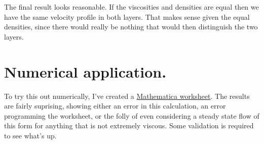 The final result looks reasonable.  If the viscosities and densities are equal then we have the same velocity profile in both layers.  That makes sense given the equal densities, since there would really be nothing that would then distinguish the two layers.

\section{Numerical application.}

To try this out numerically, I've created a \href{https://raw.github.com/peeterjoot/physicsplay/master/notes/phy454/twoLayerInclinedFlowDifferentDensities.cdf}{Mathematica worksheet}.  The results are fairly suprising, showing either an error in this calculation, an error programming the worksheet, or the folly of even considering a steady state flow of this form for anything that is not extremely viscous.  Some validation is required to see what's up.

\EndArticle
